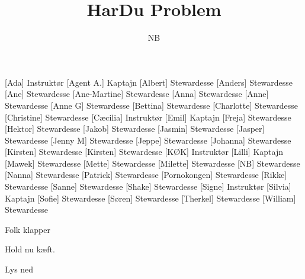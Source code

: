 \documentclass[a4paper,11pt]{article}
\title{HarDu Problem}
\author{NB}
\begin{document}
\maketitle

\begin{roles}
[Ada] Instruktør
[Agent A.] Kaptajn
[Albert] Stewardesse
[Anders] Stewardesse
[Ane] Stewardesse
[Ane-Martine] Stewardesse
[Anna] Stewardesse
[Anne] Stewardesse
[Anne G] Stewardesse
[Bettina] Stewardesse
[Charlotte] Stewardesse
[Christine] Stewardesse
[Cæcilia] Instruktør
[Emil] Kaptajn
[Freja] Stewardesse
[Hektor] Stewardesse
[Jakob] Stewardesse
[Jasmin] Stewardesse
[Jasper] Stewardesse
[Jenny M] Stewardesse
[Jeppe] Stewardesse
[Johanna] Stewardesse
[Kirsten] Stewardesse
[Kirsten] Stewardesse
[KØK] Instruktør
[Lilli] Kaptajn
[Mawek] Stewardesse
[Mette] Stewardesse
[Milette] Stewardesse
[NB] Stewardesse
[Nanna] Stewardesse
[Patrick] Stewardesse
[Pornokongen] Stewardesse
[Rikke] Stewardesse
[Sanne] Stewardesse
[Shake] Stewardesse
[Signe] Instruktør
[Silvia] Kaptajn
[Sofie] Stewardesse
[Søren] Stewardesse
[Therkel] Stewardesse
[William] Stewardesse
\end{roles}


\begin{sketch}
\scene Folk klapper

 Hold nu kæft.

\scene Lys ned
\end{sketch}
\end{document}
